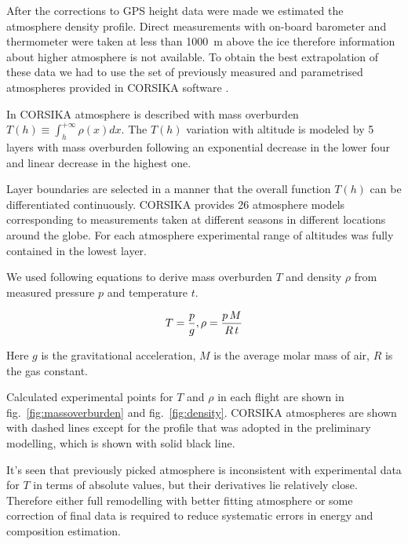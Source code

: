 \documentclass[final,5p,times,twocolumn]{elsarticle}
\begin{document}
After the corrections to GPS height data were made we estimated the atmosphere density profile. Direct measurements with on-board barometer and thermometer were taken at less than 1000~m above the ice therefore information about higher atmosphere is not available. To obtain the best extrapolation of these data we had to use the set of previously measured and parametrised atmospheres provided in CORSIKA software \cite{hec98}.

In CORSIKA atmosphere is described with mass overburden $T(h) \equiv \int_{h}^{+\infty} \rho(x) dx$. The $T(h)$ variation with altitude is modeled by 5 layers with mass overburden following an exponential decrease in the lower four and linear decrease in the highest one.


Layer boundaries are selected in a manner that the overall function $T(h)$ can be differentiated continuously. CORSIKA provides 26 atmosphere models corresponding to measurements taken at different seasons in different locations around the globe. For each atmosphere experimental range of altitudes was fully contained in the lowest layer.

We used following equations to derive mass overburden $T$ and density $\rho$ from measured pressure $p$ and temperature $t$.

\begin{equation}
T     = \frac{p}{g}, \\
\rho  = \frac{p \, M}{R \, t} \\
\end{equation}

Here $g$ is the gravitational acceleration, $M$ is the average molar mass of air, $R$ is the gas constant.

Calculated experimental points for $T$ and $\rho$ in each flight are shown in fig.~\ref{fig:massoverburden} and fig.~\ref{fig:density}. CORSIKA atmospheres are shown with dashed lines except for the profile that was adopted in the preliminary modelling, which is shown with solid black line.

It's seen that previously picked atmosphere is inconsistent with experimental data for $T$ in terms of absolute values, but their derivatives lie relatively close. Therefore either full remodelling with better fitting atmosphere or some correction of final data is required to reduce systematic errors in energy and composition estimation.
\end{document}
